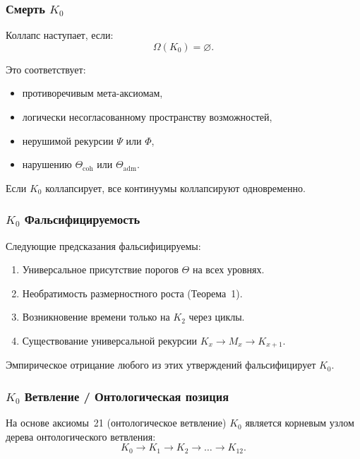 \subsubsection{Смерть \texorpdfstring{$K_0$}{K_0}}

Коллапс наступает, если:
\[
\Omega(K_0) = \varnothing.
\]

Это соответствует:
\begin{itemize}
    \item противоречивым мета-аксиомам,
    \item логически несогласованному пространству возможностей,
    \item нерушимой рекурсии $\Psi$ или $\Phi$,
    \item нарушению $\Theta_{\mathrm{coh}}$ или $\Theta_{\mathrm{adm}}$.
\end{itemize}

Если $K_0$ коллапсирует, все континуумы коллапсируют одновременно.

\subsubsection{\texorpdfstring{$K_0$}{K_0} Фальсифицируемость}

Следующие предсказания фальсифицируемы:
\begin{enumerate}
    \item Универсальное присутствие порогов $\Theta$ на всех уровнях.
    \item Необратимость размерностного роста (Теорема~1).
    \item Возникновение времени только на $K_2$ через циклы.
    \item Существование универсальной рекурсии $K_x\to M_x\to K_{x+1}$.
\end{enumerate}

Эмпирическое отрицание любого из этих утверждений фальсифицирует $K_0$.

\subsubsection{\texorpdfstring{$K_0$}{K_0} Ветвление / Онтологическая позиция}

На основе аксиомы~21 (онтологическое ветвление) $K_0$ является корневым
узлом дерева онтологического ветвления:
\[
K_0 \rightarrow K_1 \rightarrow K_2 \rightarrow \dots \rightarrow K_{12}.
\]

